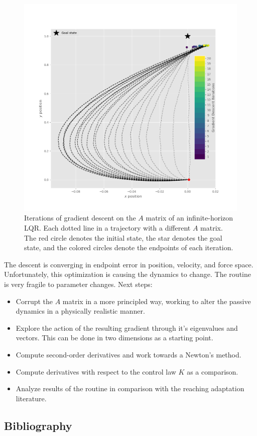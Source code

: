 \documentclass[
  a4paper,
]{article}
\providecommand{\tightlist}{%
  \setlength{\itemsep}{0pt}\setlength{\parskip}{0pt}}
\begin{document}
\begin{figure}
\hypertarget{fig:gradient_descent}{%
\centering
\includegraphics{images/simulations/gradient_descent_on_A.png}
\caption{Iterations of gradient descent on the \(A\) matrix of an
infinite-horizon LQR. Each dotted line in a trajectory with a different
\(A\) matrix. The red circle denotes the initial state, the star denotes
the goal state, and the colored circles denote the endpoints of each
iteration.}\label{fig:gradient_descent}
}
\end{figure}

The descent is converging in endpoint error in position, velocity, and
force space. Unfortunately, this optimization is causing the dynamics to
change. The routine is very fragile to parameter changes. Next steps:

\begin{itemize}
\tightlist
\item
  Corrupt the \(A\) matrix in a more principled way, working to alter
  the passive dynamics in a physically realistic manner.
\item
  Explore the action of the resulting gradient through it's eigenvalues
  and vectors. This can be done in two dimensions as a starting point.
\item
  Compute second-order derivatives and work towards a Newton's method.
\item
  Compute derivatives with respect to the control law \(K\) as a
  comparison.
\item
  Analyze results of the routine in comparison with the reaching
  adaptation literature.
\end{itemize}

\newpage

\hypertarget{bibliography}{%
\subsection{Bibliography}\label{bibliography}}
\end{document}
